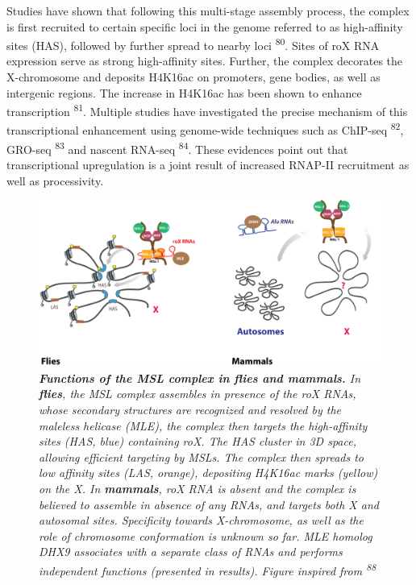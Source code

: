 \documentclass[11pt,twoside]{MPIthesis}
\theoremstyle{definition}
\theoremstyle{definition}
\theoremstyle{definition}
\theoremstyle{remark}
\begin{document}
Studies have shown that following this multi-stage assembly process, the
complex is first recruited to certain specific loci in the genome
referred to as high-affinity sites (HAS), followed by further spread to
nearby loci \textsuperscript{80}. Sites of roX RNA expression serve as
strong high-affinity sites. Further, the complex decorates the
X-chromosome and deposits H4K16ac on promoters, gene bodies, as well as
intergenic regions. The increase in H4K16ac has been shown to enhance
transcription \textsuperscript{81}. Multiple studies have investigated
the precise mechanism of this transcriptional enhancement using
genome-wide techniques such as ChIP-seq \textsuperscript{82}, GRO-seq
\textsuperscript{83} and nascent RNA-seq \textsuperscript{84}. These
evidences point out that transcriptional upregulation is a joint result
of increased RNAP-II recruitment as well as processivity.
\begin{figure}

{\centering \includegraphics[width=0.9\linewidth]{figures/intro_fig3} 

}

\caption[Functions of the MSL complex in flies and mammals]{\emph{\textbf{Functions of the MSL complex in flies and
mammals.} In \textbf{flies}, the MSL complex assembles in presence of
the roX RNAs, whose secondary structures are recognized and resolved by
the maleless helicase (MLE), the complex then targets the high-affinity
sites (HAS, blue) containing roX. The HAS cluster in 3D space, allowing
efficient targeting by MSLs. The complex then spreads to low affinity
sites (LAS, orange), depositing H4K16ac marks (yellow) on the X. In
\textbf{mammals}, roX RNA is absent and the complex is believed to
assemble in absence of any RNAs, and targets both X and autosomal sites.
Specificity towards X-chromosome, as well as the role of chromosome
conformation is unknown so far. MLE homolog DHX9 associates with a
separate class of RNAs and performs independent functions (presented in
results). Figure inspired from \textsuperscript{88}}}\label{fig:unnamed-chunk-3}
\end{figure}
\end{document}
